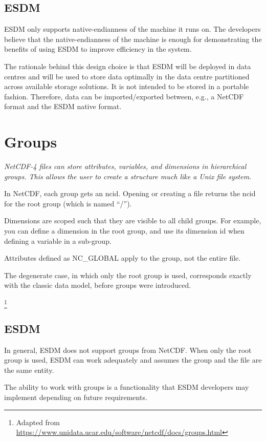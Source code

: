 \subsection{ESDM}

ESDM only supports native-endianness of the machine it runs on.
The developers believe that the native-endianness of the machine is enough for demonstrating the benefits of using ESDM to improve efficiency in the system.

The rationale behind this design choice is that ESDM will be deployed in data centres and will be used to store data optimally in the data centre partitioned across available storage solutions.
It is not intended to be stored in a portable fashion. Therefore, data can be imported/exported between, e.g., a NetCDF format and the ESDM native format.

\section{Groups}

{\itshape
NetCDF-4 files can store attributes, variables, and dimensions in hierarchical groups. This allows the user to create a structure much like a Unix file system.

In NetCDF, each group gets an ncid. Opening or creating a file returns the ncid for the root group (which is named ``/'').

Dimensions are scoped such that they are visible to all child groups. For example, you can define a dimension in the root group, and use its dimension id when defining a variable in a sub-group.

Attributes defined as NC\_GLOBAL apply to the group, not the entire file.

The degenerate case, in which only the root group is used, corresponds exactly with the classic data model, before groups were introduced.
}\footnote{Adapted from \url{https://www.unidata.ucar.edu/software/netcdf/docs/groups.html}}

\subsection{ESDM}

In general, ESDM does not support groups from NetCDF. When only the root group is used, ESDM can work adequately and assumes the group and the file are the same entity.

The ability to work with groups is a functionality that ESDM developers may implement depending on future requirements.

